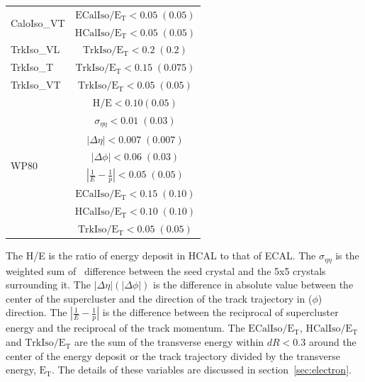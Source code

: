 \begin{table}[htp]
\begin{tabular}{l|c}
    \hline
    \multirow{2}{*}{CaloIso\_VT} & $\mathrm{ECalIso/E_T <0.05\;(0.05)}$ \\
                                 & $\mathrm{HCalIso/E_T <0.05\;(0.05)}$ \\
    \hline \hline
    TrkIso\_VL                   & $\mathrm{TrkIso/E_T <0.2\;(0.2)}$ \\
    \hline
    TrkIso\_T                   & $\mathrm{TrkIso/E_T <0.15\;(0.075)}$ \\
    \hline
    TrkIso\_VT                   & $\mathrm{TrkIso/E_T <0.05\;(0.05)}$ \\
    \hline \hline
    \multirow{8}{*}{WP80} 		& $\mathrm{H/E < 0.10 (0.05) }$ \\
                               	& $\sigma_{\eta\eta}\mathrm{< 0.01\;(0.03)}$ \\
    							& $|\Delta\eta|\mathrm{< 0.007\; (0.007)}$ \\
                               	& $|\Delta\phi|\mathrm{< 0.06\;(0.03)}$  \\
                               	& $|\frac{1}{E}-\frac{1}{p}|\mathrm{< 0.05\;(0.05)}$  \\
    							& $\mathrm{ECalIso/E_T <0.15\;(0.10)}$ \\
                                & $\mathrm{HCalIso/E_T <0.10\;(0.10)}$ \\
                       			& $\mathrm{TrkIso/E_T <0.05\;(0.05)}$\\
    \hline
 \end{tabular}
 \label{tab:trg_requirement_def}
\end{table}
The H/E is the ratio of energy deposit in HCAL to that of ECAL. 
The $\sigma_{\eta\eta}$ is the weighted sum of \Eta\ difference between the 
seed crystal and the 5x5 crystals surrounding it.   
The $|\Delta\eta|(|\Delta\phi|)$ is the difference in absolute value between 
the center of the supercluster and the direction of the track trajectory 
in \Eta($\phi$) direction.   
The $|\frac{1}{E}-\frac{1}{p}|$ is the difference between 
the reciprocal of supercluster energy 
and the reciprocal of the track momentum.  
The $\mathrm{ECalIso/E_T}$, $\mathrm{HCalIso/E_T}$ and $\mathrm{TrkIso/E_T}$ 
are the sum of the transverse energy within $dR<0.3$ %
around the center of the energy deposit or the track trajectory
divided by the transverse energy, $\mathrm{E_T}$.
The details of these variables are discussed in section~\ref{sec:electron}.

